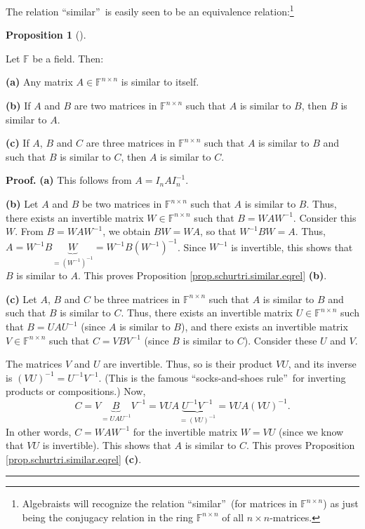 \documentclass[numbers=enddot,12pt,final,onecolumn,notitlepage]{scrartcl}%
\numberwithin{exer}{subsection}
\theoremstyle{definition}
\newtheorem{prop}[theo]{Proposition}
\newenvironment{proposition}[1][]
{\begin{prop}[#1]\begin{leftbar}}
{\end{leftbar}\end{prop}}
\newenvironment{proof}[1][Proof]{\noindent\textbf{#1.} }{\ \rule{0.5em}{0.5em}}
\begin{document}
The relation \textquotedblleft similar\textquotedblright\ is easily seen to be
an equivalence relation:\footnote{Algebraists will recognize the relation
\textquotedblleft similar\textquotedblright\ (for matrices in $\mathbb{F}%
^{n\times n}$) as just being the conjugacy relation in the ring $\mathbb{F}%
^{n\times n}$ of all $n\times n$-matrices.}

\begin{proposition}
\label{prop.schurtri.similar.eqrel}Let $\mathbb{F}$ be a field. Then:

\textbf{(a)} Any matrix $A\in\mathbb{F}^{n\times n}$ is similar to itself.

\textbf{(b)} If $A$ and $B$ are two matrices in $\mathbb{F}^{n\times n}$ such
that $A$ is similar to $B$, then $B$ is similar to $A$.

\textbf{(c)} If $A$, $B$ and $C$ are three matrices in $\mathbb{F}^{n\times
n}$ such that $A$ is similar to $B$ and such that $B$ is similar to $C$, then
$A$ is similar to $C$.
\end{proposition}

\begin{proof}
\textbf{(a)} This follows from $A=I_{n}AI_{n}^{-1}$.

\textbf{(b)} Let $A$ and $B$ be two matrices in $\mathbb{F}^{n\times n}$ such
that $A$ is similar to $B$. Thus, there exists an invertible matrix
$W\in\mathbb{F}^{n\times n}$ such that $B=WAW^{-1}$. Consider this $W$. From
$B=WAW^{-1}$, we obtain $BW=WA$, so that $W^{-1}BW=A$. Thus, $A=W^{-1}%
B\underbrace{W}_{=\left(  W^{-1}\right)  ^{-1}}=W^{-1}B\left(  W^{-1}\right)
^{-1}$. Since $W^{-1}$ is invertible, this shows that $B$ is similar to $A$.
This proves Proposition \ref{prop.schurtri.similar.eqrel} \textbf{(b)}.

\textbf{(c)} Let $A$, $B$ and $C$ be three matrices in $\mathbb{F}^{n\times
n}$ such that $A$ is similar to $B$ and such that $B$ is similar to $C$. Thus,
there exists an invertible matrix $U\in\mathbb{F}^{n\times n}$ such that
$B=UAU^{-1}$ (since $A$ is similar to $B$), and there exists an invertible
matrix $V\in\mathbb{F}^{n\times n}$ such that $C=VBV^{-1}$ (since $B$ is
similar to $C$). Consider these $U$ and $V$.

The matrices $V$ and $U$ are invertible. Thus, so is their product $VU$, and
its inverse is $\left(  VU\right)  ^{-1}=U^{-1}V^{-1}$. (This is the famous
\textquotedblleft socks-and-shoes rule\textquotedblright\ for inverting
products or compositions.) Now,%
\[
C=V\underbrace{B}_{=UAU^{-1}}V^{-1}=VUA\underbrace{U^{-1}V^{-1}}_{=\left(
VU\right)  ^{-1}}=VUA\left(  VU\right)  ^{-1}.
\]
In other words, $C=WAW^{-1}$ for the invertible matrix $W=VU$ (since we know
that $VU$ is invertible). This shows that $A$ is similar to $C$. This proves
Proposition \ref{prop.schurtri.similar.eqrel} \textbf{(c)}.
\end{proof}
\end{document}
